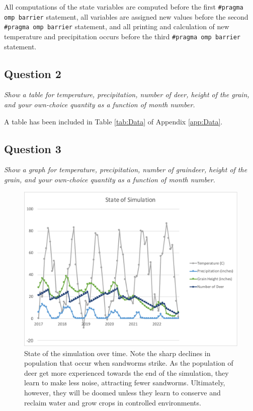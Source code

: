 \documentclass{article}
\begin{document}
All computations of the state variables are computed before the first \texttt{\#pragma omp barrier} statement, all variables are assigned new values before the second \texttt{\#pragma omp barrier} statement, and all printing and calculation of new temperature and precipitation occurs before the third \texttt{\#pragma omp barrier} statement.

\subsection*{Question 2}
\textit{Show a table for temperature, precipitation, number of deer, height of the grain, and your own-choice quantity as a function of month number.}

A table has been included in Table \ref{tab:Data} of Appendix \ref{app:Data}.

\newpage

\subsection*{Question 3}
\textit{Show a graph for temperature, precipitation, number of graindeer, height of the grain, and your own-choice quantity as a function of month number.}

\begin{figure}
        \begin{center}
        \includegraphics[width=1.0\linewidth]{Picture1.pdf}
        \end{center}
        \caption{State of the simulation over time.  Note the sharp declines in population that occur when sandworms strike.  As the population of deer get more experienced towards the end of the simulation, they learn to make less noise, attracting fewer sandworms.  Ultimately, however, they will be doomed unless they learn to conserve and reclaim water and grow crops in controlled environments.}
        \label{fig:State Plot}
\end{figure}
\end{document}
